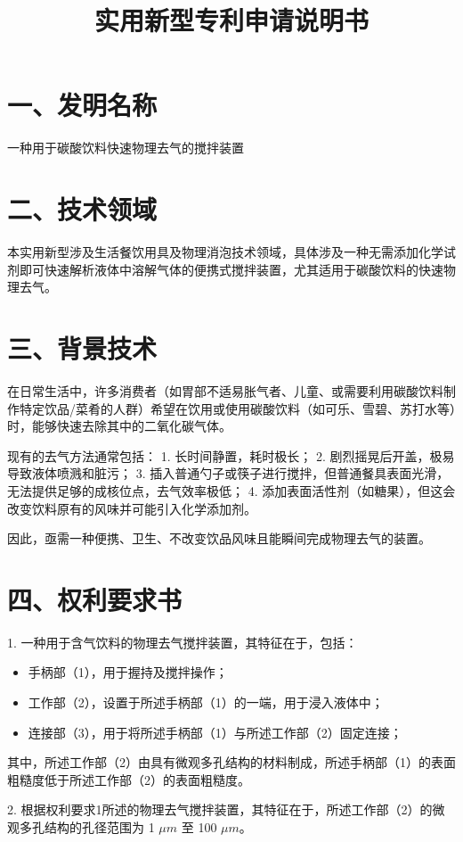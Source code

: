 \documentclass[a4paper,12pt]{ctexart}
\title{\LARGE \textbf{实用新型专利申请说明书}}
\author{}
\date{}
\begin{document}
\maketitle

\section*{一、发明名称}
一种用于碳酸饮料快速物理去气的搅拌装置

\section*{二、技术领域}
本实用新型涉及生活餐饮用具及物理消泡技术领域，具体涉及一种无需添加化学试剂即可快速解析液体中溶解气体的便携式搅拌装置，尤其适用于碳酸饮料的快速物理去气。

\section*{三、背景技术}
在日常生活中，许多消费者（如胃部不适易胀气者、儿童、或需要利用碳酸饮料制作特定饮品/菜肴的人群）希望在饮用或使用碳酸饮料（如可乐、雪碧、苏打水等）时，能够快速去除其中的二氧化碳气体。

现有的去气方法通常包括：
1. 长时间静置，耗时极长；
2. 剧烈摇晃后开盖，极易导致液体喷溅和脏污；
3. 插入普通勺子或筷子进行搅拌，但普通餐具表面光滑，无法提供足够的成核位点，去气效率极低；
4. 添加表面活性剂（如糖果），但这会改变饮料原有的风味并可能引入化学添加剂。

因此，亟需一种便携、卫生、不改变饮品风味且能瞬间完成物理去气的装置。

\section*{四、权利要求书}
1. 一种用于含气饮料的物理去气搅拌装置，其特征在于，包括：
\begin{itemize}
    \item 手柄部（1），用于握持及搅拌操作；
    \item 工作部（2），设置于所述手柄部（1）的一端，用于浸入液体中；
    \item 连接部（3），用于将所述手柄部（1）与所述工作部（2）固定连接；
\end{itemize}
其中，所述工作部（2）由具有微观多孔结构的材料制成，所述手柄部（1）的表面粗糙度低于所述工作部（2）的表面粗糙度。

2. 根据权利要求1所述的物理去气搅拌装置，其特征在于，所述工作部（2）的微观多孔结构的孔径范围为 1 $\mu m$ 至 100 $\mu m$。
\end{document}
